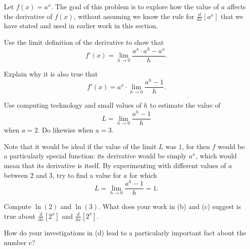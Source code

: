 \begin{exercises}
\item Let $f(x) = a^x$.  The goal of this problem is to explore how the value of $a$ affects the derivative of $f(x)$, without assuming we know the rule for $\frac{d}{dx}[a^x]$ that we have stated and used in earlier work in this section.
\ba
	\item Use the limit definition of the derivative to show that
	$$f'(x) = \lim_{h \to 0} \frac{a^x \cdot a^h - a^x}{h}.$$
	\item Explain why it is also true that
	$$f'(x) = a^x \cdot \lim_{h \to 0} \frac{a^h - 1}{h}.$$
	\item Use computing technology and small values of $h$ to estimate the value of 
	$$L = \lim_{h \to 0} \frac{a^h - 1}{h}$$
	when $a = 2$.  Do likewise when $a = 3$.
	\item Note that it would be ideal if the value of the limit $L$ was $1$, for then $f$ would be a particularly special function:  its derivative would be simply $a^x$, which would mean that its derivative is itself.  By experimenting with different values of $a$ between $2$ and $3$, try to find a value for $a$ for which 
	$$L = \lim_{h \to 0} \frac{a^h - 1}{h} = 1.$$
	\item Compute $\ln(2)$ and $\ln(3)$.  What does your work in (b) and (c) suggest is true about $\frac{d}{dx}[2^x]$ and $\frac{d}{dx}[2^x]$.
	\item How do your investigations in (d) lead to a particularly important fact about the number $e$?
\ea

\end{exercises}
\afterexercises